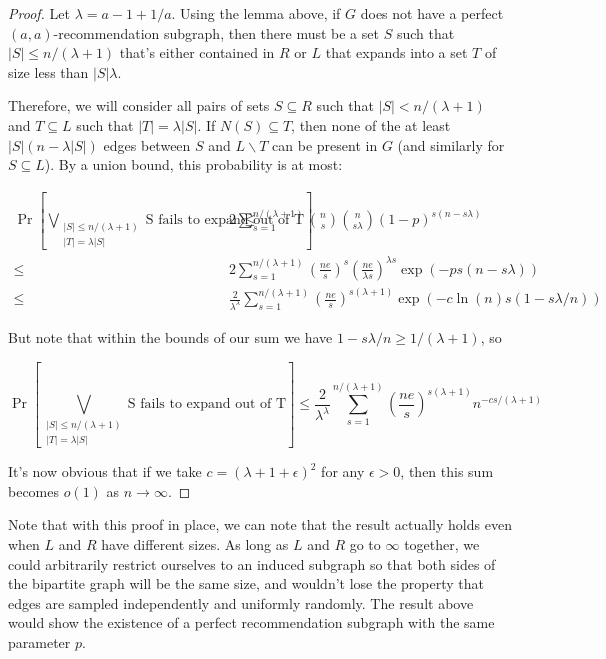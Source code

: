 \begin{proof}
Let $\lambda = a - 1 + 1/a$. Using the lemma above, if $G$ does not have a perfect $(a,a)$-recommendation subgraph, then there must be a set $S$ such that $|S|\leq n/(\lambda+1)$ that's either contained in $R$ or $L$ that expands into a set $T$ of size less than $|S|\lambda$.

Therefore, we will consider all pairs of sets $S\subseteq R$ such that $|S|<n/(\lambda+1)$ and $T\subseteq L$ such that $|T| = \lambda|S|$. If $N(S)\subseteq T$, then none of the at least $|S|(n-\lambda |S|)$ edges between $S$ and $L\backslash T$ can be present in $G$ (and similarly for $S\subseteq L$). By a union bound, this probability is at most: 

\begin{align*}
       \Pr\left[\bigvee_{\substack{|S|\leq n/(\lambda+1) \\ |T| = \lambda |S|}} \text{S fails to expand out of T}\right]
\leq&  2\sum_{s=1}^{n/(\lambda+1)} \binom{n}{s}\binom{n}{s\lambda}(1-p)^{s(n-s\lambda)} \\
\leq&  2\sum_{s=1}^{n/(\lambda+1)} \left(\frac{ne}{s}\right)^s \left(\frac{ne}{\lambda s}\right)^{\lambda s} \exp\left(-ps(n-s\lambda)\right) \\
\leq&  \frac{2}{\lambda^\lambda} \sum_{s=1}^{n/(\lambda+1)} \left(\frac{ne}{s}\right)^{s(\lambda+1)} \exp\left(-c\ln(n)s(1-s\lambda/n)\right)
\end{align*}

But note that within the bounds of our sum we have $1-s\lambda/n \geq 1/(\lambda+1)$, so

\[
\Pr\left[\bigvee_{\substack{|S|\leq n/(\lambda+1) \\ |T| = \lambda |S|}} \text{S fails to expand out of T}\right]
\leq \frac{2}{\lambda^\lambda} \sum_{s=1}^{n/(\lambda+1)} \left(\frac{ne}{s}\right)^{s(\lambda+1)} n^{-cs/(\lambda+1)}
\]

It's now obvious that if we take $c=(\lambda+1+\epsilon)^2$ for any $\epsilon>0$, then this sum becomes $o(1)$ as $n\to\infty$. 
\end{proof}

Note that with this proof in place, we can note that the result actually holds even when $L$ and $R$ have different sizes. As long as $L$ and $R$ go to $\infty$ together, we could arbitrarily restrict ourselves to an induced subgraph so that both sides of the bipartite graph will be the same size, and wouldn't lose the property that edges are sampled independently and uniformly randomly. The result above would show the existence of a perfect recommendation subgraph with the same parameter $p$. \vs

